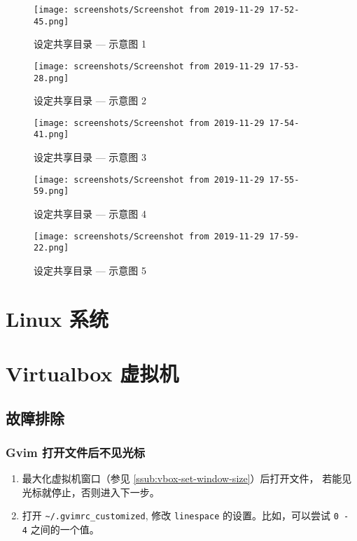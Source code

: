 \documentclass[
    11pt,
    cite=authoryear,
    device=normal,
    lang=cn,
    mode=simple,
    result=answer,
    toc=onecol,
]{elegantbook_sierxue}
\begin{document}
\begin{figure}[!htbp]
  \centering
  \texttt{[image: screenshots/Screenshot from
  2019-11-29 17-52-45.png]}
  \caption{设定共享目录 --- 示意图 1}
\end{figure}
\begin{figure}[!htbp]
  \centering
  \texttt{[image: screenshots/Screenshot from
  2019-11-29 17-53-28.png]}
  \caption{设定共享目录 --- 示意图 2}
\end{figure}
\begin{figure}[!htbp]
  \centering
  \texttt{[image: screenshots/Screenshot from
  2019-11-29 17-54-41.png]}
  \caption{设定共享目录 --- 示意图 3}
\end{figure}
\begin{figure}[!htbp]
  \centering
  \texttt{[image: screenshots/Screenshot from
  2019-11-29 17-55-59.png]}
  \caption{设定共享目录 --- 示意图 4}
\end{figure}
\begin{figure}[!htbp]
  \centering
  \texttt{[image: screenshots/Screenshot from
  2019-11-29 17-59-22.png]}
  \caption{设定共享目录 --- 示意图 5}
\end{figure}

\section{Linux 系统}%
\label{sec:linux-a}

\section{Virtualbox 虚拟机}%
\label{sec:vbox-a}

\subsection{故障排除}%
\label{sub:vim-troubleshooting}

\subsubsection{Gvim 打开文件后不见光标}%
\label{ssub:vim-ts-cursor}

\begin{enumerate}
    \item 最大化虚拟机窗口（参见
        \ref{ssub:vbox-set-window-size}）后打开文件，
        若能见光标就停止，否则进入下一步。
    \item 打开 \lstinline{~/.gvimrc_customized}, 修改
        \lstinline{linespace} 的设置。比如，可以尝试  \lstinline{0 - 4}
        之间的一个值。
\end{enumerate}
\end{document}
